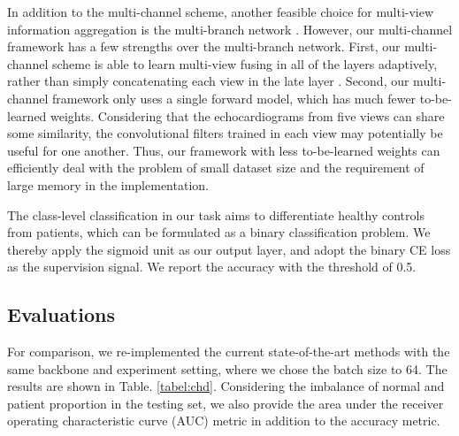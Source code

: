 In addition to the multi-channel scheme, another feasible choice for multi-view information aggregation is the multi-branch network \cite{lee2016multi}. However, our multi-channel framework has a few strengths over the multi-branch network. First, our multi-channel scheme is able to learn multi-view fusing in all of the layers adaptively, rather than simply concatenating each view in the late layer \cite{lee2016multi}. Second, our multi-channel framework only uses a single forward model, which has much fewer to-be-learned weights. Considering that the echocardiograms from five views can share some similarity, the convolutional filters trained in each view may potentially be useful for one another. Thus, our framework with less to-be-learned weights can efficiently deal with the problem of small dataset size and the requirement of large memory in the implementation.


The class-level classification in our task aims to differentiate healthy controls from patients, which can be formulated as a binary classification problem. We thereby apply the sigmoid unit as our output layer, and adopt the binary CE loss as the supervision signal. We report the accuracy with the threshold of 0.5.

\subsection{Evaluations}

For comparison, we re-implemented the current state-of-the-art methods with the same backbone and experiment setting, where we chose the batch size to 64. The results are shown in Table. \ref{tabel:chd}. Considering the imbalance of normal and patient proportion in the testing set, we also provide the area under the receiver operating characteristic curve (AUC) metric in addition to the accuracy metric. 


